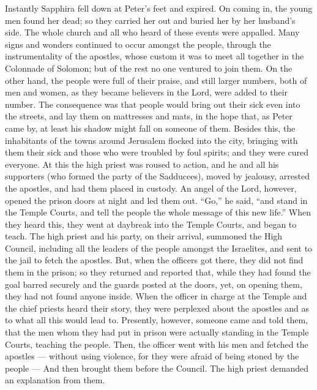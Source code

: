  Instantly Sapphira fell down at Peter's feet and expired.
On coming in, the young men found her dead; so they carried her out and
buried her by her husband's side.  The whole church and all
who heard of these events were appalled.  Many signs and
wonders continued to occur amongst the people, through the
instrumentality of the apostles, whose custom it was to meet all
together in the Colonnade of Solomon;  but of the rest no
one ventured to join them. On the other hand, the people were full of
their praise,  and still larger numbers, both of men and
women, as they became believers in the Lord, were added to their number.
 The consequence was that people would bring out their sick
even into the streets, and lay them on mattresses and mats, in the hope
that, as Peter came by, at least his shadow might fall on someone of
them.  Besides this, the inhabitants of the towns around
Jerusalem flocked into the city, bringing with them their sick and those
who were troubled by foul spirits; and they were cured everyone.
 At this the high priest was roused to action, and he and
all his supporters (who formed the party of the Sadducees), moved by
jealousy,  arrested the apostles, and had them placed in
custody.  An angel of the Lord, however, opened the prison
doors at night and led them out.  ``Go,'' he said, ``and
stand in the Temple Courts, and tell the people the whole message of
this new life.''  When they heard this, they went at
daybreak into the Temple Courts, and began to teach. The high priest and
his party, on their arrival, summoned the High Council, including all
the leaders of the people amongst the Israelites, and sent to the jail
to fetch the apostles.  But, when the officers got there,
they did not find them in the prison; so they returned and reported
that,  while they had found the goal barred securely and
the guards posted at the doors, yet, on opening them, they had not found
anyone inside.  When the officer in charge at the Temple
and the chief priests heard their story, they were perplexed about the
apostles and as to what all this would lead to.  Presently,
however, someone came and told them, that the men whom they had put in
prison were actually standing in the Temple Courts, teaching the people.
 Then, the officer went with his men and fetched the
apostles --- without using violence, for they were afraid of being
stoned by the people ---  And then brought them before the
Council. The high priest demanded an explanation from them.

